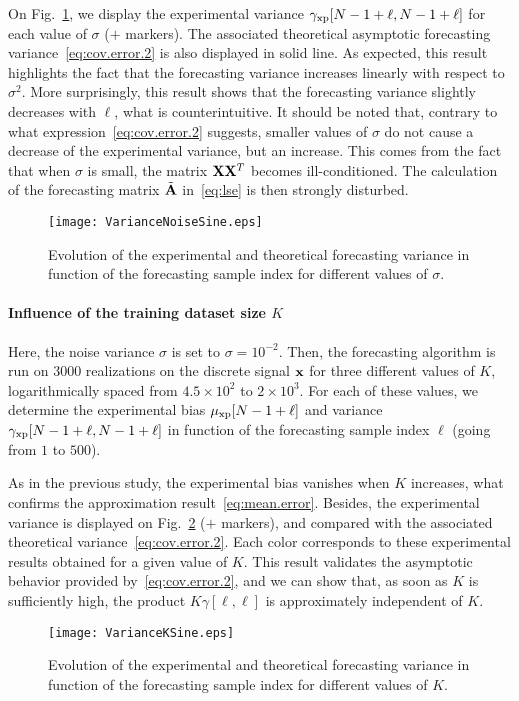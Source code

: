 On Fig.~\ref{fig:res.noise.sine}, we display the experimental variance $\gamma_{{\mathrm{xp}}}[N-1+\ell,N-1+\ell]$ for each value of $\sigma$ ($+$ markers). The associated theoretical asymptotic forecasting variance~\eqref{eq:cov.error.2} is also displayed in solid line. As expected, this result highlights the fact that the forecasting variance increases linearly with respect to $\sigma^2$. More surprisingly, this result shows that the forecasting variance slightly decreases with $\ell$, what is counterintuitive. It should be noted that, contrary to what expression~\eqref{eq:cov.error.2} suggests, smaller values of $\sigma$ do not  cause a decrease of the experimental variance, but an increase. This comes from the fact that when $\sigma$ is small, the matrix ${\mathbf X}{\mathbf X}^T$ becomes ill-conditioned. The calculation of the forecasting matrix $\tilde{{\mathbf A}}$ in~\eqref{eq:lse} is then strongly disturbed.
\begin{figure}
\texttt{[image: VarianceNoiseSine.eps]}
\caption{Evolution of the experimental and theoretical forecasting variance in function of the forecasting sample index for different values of $\sigma$.}
\label{fig:res.noise.sine}
\end{figure}

\paragraph{Influence of the training dataset size $K$} Here, the noise variance $\sigma$ is set to $\sigma=10^{-2}$. Then, the forecasting algorithm is run on 3000 realizations on the discrete signal ${\mathbf x}$ for three different values of $K$, logarithmically spaced from $4.5\times 10^{2}$ to $2\times 10^{3}$. For each of these values, we determine the experimental bias $\mu_{{\mathrm{xp}}}[N-1+\ell]$ and variance $\gamma_{{\mathrm{xp}}}[N-1+\ell,N-1+\ell]$ in function of the forecasting sample index $\ell$ (going from $1$ to $500$). 

As in the previous study, the experimental bias vanishes when $K$ increases, what confirms the approximation result~\eqref{eq:mean.error}. Besides, the experimental variance  is displayed on Fig.~\ref{fig:res.size.sine} ($+$ markers), and compared with the associated theoretical variance~\eqref{eq:cov.error.2}. Each color corresponds to these experimental results obtained for a given value of $K$. This result validates the asymptotic behavior provided by~\eqref{eq:cov.error.2}, and we can show that, as soon as $K$ is sufficiently high, the product $K\gamma[\ell,\ell]$ is approximately independent of $K$.
\begin{figure}
\texttt{[image: VarianceKSine.eps]}
\caption{Evolution of the experimental and theoretical forecasting variance in function of the forecasting sample index for different values of $K$.}
\label{fig:res.size.sine}
\end{figure}

